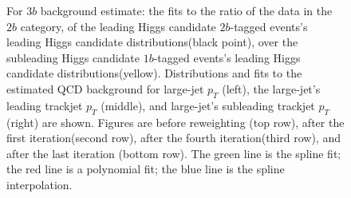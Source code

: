 \begin{figure}[htbp!]
\begin{center}
\caption{For $3b$ background estimate: the fits to the ratio of the data in the $2b$ category, of the leading Higgs candidate $2b$-tagged events's leading Higgs candidate distributions(black point), over the subleading Higgs candidate $1b$-tagged events's leading Higgs candidate distributions(yellow). Distributions and fits to the estimated QCD background for large-\R jet $p_{T}$ (left),  the large-\R jet's leading trackjet $p_T$ (middle), and large-\R jet's subleading trackjet $p_T$ (right) are shown.  Figures are before reweighting (top row), after the first iteration(second row), after the fourth iteration(third row), and after the last iteration (bottom row). The green line is the spline fit; the red line is a polynomial fit; the blue line is the spline interpolation.}
\label{fig:rw-3b-subl}
\end{center}
\end{figure}

